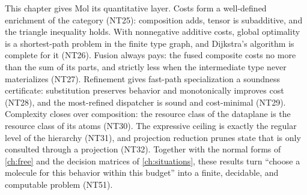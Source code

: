 This chapter gives Mol its quantitative layer. Costs form a well-defined
enrichment of the category (NT25): composition adds, tensor is subadditive,
and the triangle inequality holds. With nonnegative additive costs, global
optimality is a shortest-path problem in the finite type graph, and Dijkstra's
algorithm is complete for it (NT26). Fusion always pays: the fused composite
costs no more than the sum of its parts, and strictly less when the
intermediate type never materializes (NT27). Refinement gives fast-path
specialization a soundness certificate: substitution preserves behavior and
monotonically improves cost (NT28), and the most-refined dispatcher is sound
and cost-minimal (NT29). Complexity closes over composition: the resource
class of the dataplane is the resource class of its atoms (NT30). The
expressive ceiling is exactly the regular level of the hierarchy (NT31), and
projection reduction prunes state that is only consulted through a projection
(NT32). Together with the normal forms of \autoref{ch:free} and the decision
matrices of \autoref{ch:situations}, these results turn ``choose a molecule
for this behavior within this budget'' into a finite, decidable, and
computable problem (NT51).

